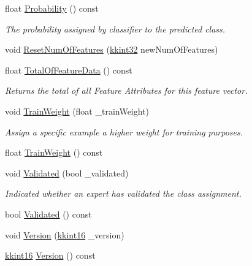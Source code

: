 \begin{DoxyCompactItemize}
float \hyperlink{class_k_k_m_l_l_1_1_feature_vector_ac6778d8d1890522e04054a205c2a6eff}{Probability} () const 
\begin{DoxyCompactList}\small\item\em The probability assigned by classifier to the predicted class. \end{DoxyCompactList}\item 
void \hyperlink{class_k_k_m_l_l_1_1_feature_vector_a4fecf015e319b230fec4f7265f0c263b}{Reset\+Num\+Of\+Features} (\hyperlink{namespace_k_k_b_a8fa4952cc84fda1de4bec1fbdd8d5b1b}{kkint32} new\+Num\+Of\+Features)
\item 
float \hyperlink{class_k_k_m_l_l_1_1_feature_vector_a456f2d6613a48d7be9de47fbb8d5515f}{Total\+Of\+Feature\+Data} () const 
\begin{DoxyCompactList}\small\item\em Returns the total of all Feature Attributes for this feature vector. \end{DoxyCompactList}\item 
void \hyperlink{class_k_k_m_l_l_1_1_feature_vector_a41a0c12e722a21446dd34f95b49dd82e}{Train\+Weight} (float \+\_\+train\+Weight)
\begin{DoxyCompactList}\small\item\em Assign a specific example a higher weight for training purposes. \end{DoxyCompactList}\item 
float \hyperlink{class_k_k_m_l_l_1_1_feature_vector_a85483a83168168c93a0ef95543a3aaff}{Train\+Weight} () const 
\item 
void \hyperlink{class_k_k_m_l_l_1_1_feature_vector_a2782e96beca586467751dba4a65dbea8}{Validated} (bool \+\_\+validated)
\begin{DoxyCompactList}\small\item\em Indicated whether an expert has validated the class assignment. \end{DoxyCompactList}\item 
bool \hyperlink{class_k_k_m_l_l_1_1_feature_vector_a94e795d6f3c0e50165a488dd3cb9b996}{Validated} () const 
\item 
void \hyperlink{class_k_k_m_l_l_1_1_feature_vector_a17650be71b83695d35d34029257652ea}{Version} (\hyperlink{namespace_k_k_b_a93809780ee294124dda4c23069f41248}{kkint16} \+\_\+version)
\item 
\hyperlink{namespace_k_k_b_a93809780ee294124dda4c23069f41248}{kkint16} \hyperlink{class_k_k_m_l_l_1_1_feature_vector_aa3cd5e127d9f3fc0030d2a535750db2a}{Version} () const 
\end{DoxyCompactItemize}
